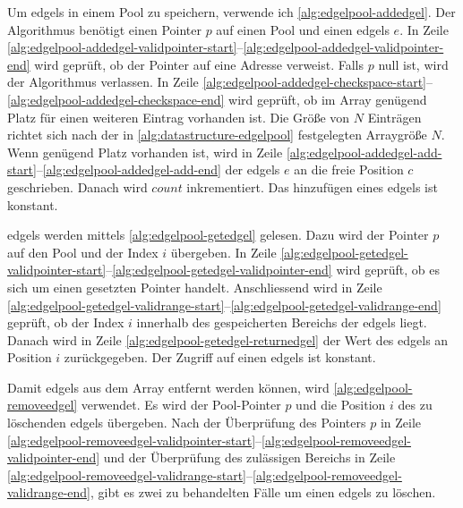 

Um \gls{edgels} in einem Pool zu speichern, verwende ich \autoref{alg:edgelpool-addedgel}. Der Algorithmus benötigt
 einen Pointer $p$ auf einen Pool und einen \gls{edgels} $e$. In Zeile
 \ref{alg:edgelpool-addedgel-validpointer-start}--\ref{alg:edgelpool-addedgel-validpointer-end} wird geprüft, ob der
 Pointer auf eine Adresse verweist. Falls $p$ null ist, wird der Algorithmus verlassen. In Zeile
 \ref{alg:edgelpool-addedgel-checkspace-start}--\ref{alg:edgelpool-addedgel-checkspace-end} wird geprüft, ob im Array
 genügend Platz für einen weiteren Eintrag vorhanden ist. Die Größe von $N$ Einträgen richtet sich nach der in \autoref{alg:datastructure-edgelpool} festgelegten Arraygröße $N$. Wenn genügend Platz vorhanden ist, wird in Zeile
 \ref{alg:edgelpool-addedgel-add-start}--\ref{alg:edgelpool-addedgel-add-end} der \gls{edgels} $e$ an die freie
 Position $c$ geschrieben. Danach wird $\mathit{count}$ inkrementiert. Das hinzufügen eines \gls{edgels} ist konstant.



\gls{edgels} werden mittels \autoref{alg:edgelpool-getedgel} gelesen. Dazu wird der Pointer $p$ auf den Pool und der
 Index $i$ übergeben. In Zeile
 \ref{alg:edgelpool-getedgel-validpointer-start}--\ref{alg:edgelpool-getedgel-validpointer-end} wird geprüft, ob es
 sich um einen gesetzten Pointer handelt. Anschliessend wird in Zeile
 \ref{alg:edgelpool-getedgel-validrange-start}--\ref{alg:edgelpool-getedgel-validrange-end} geprüft, ob der Index $i$
 innerhalb des gespeicherten Bereichs der \gls{edgels} liegt. Danach wird in Zeile
 \ref{alg:edgelpool-getedgel-returnedgel} der Wert des \gls{edgels} an Position $i$ zurückgegeben. Der Zugriff auf
 einen \gls{edgels} ist konstant.



Damit \gls{edgels} aus dem Array entfernt werden können, wird \autoref{alg:edgelpool-removeedgel} verwendet. Es wird der
 Pool-Pointer $p$ und die Position $i$ des zu löschenden \gls{edgels} übergeben. Nach der Überprüfung des Pointers $p$
 in Zeile \ref{alg:edgelpool-removeedgel-validpointer-start}--\ref{alg:edgelpool-removeedgel-validpointer-end} und der
 Überprüfung des zulässigen Bereichs in Zeile
 \ref{alg:edgelpool-removeedgel-validrange-start}--\ref{alg:edgelpool-removeedgel-validrange-end}, gibt es zwei zu
 behandelten Fälle um einen \gls{edgels} zu löschen.



